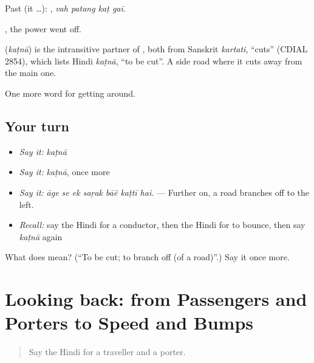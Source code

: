 Past (it …):    , \emph{vah patang kaṭ gaī}.

  , the power went off.

\begin{cousinweb}
\textbf{} (\emph{kaṭnā}) is the intransitive partner of , both from Sanskrit \emph{kartati}, \textquotedblleft{}cuts\textquotedblright{} (CDIAL 2854), which lists Hindi \emph{kaṭnā}, \textquotedblleft{}to be cut\textquotedblright{}. A side road  where it cuts away from the main one.
\end{cousinweb}

\begin{grammarlens}[title={What you've built}]
One more word for getting around.
\end{grammarlens}

\subsection*{Your turn}
\begin{itemize}
\raggedright
  \item \emph{Say it:} \emph{kaṭnā}
  \item \emph{Say it:} \emph{kaṭnā}, once more
  \item \emph{Say it:} \emph{āge se ek saṛak bāẽ kaṭtī hai.} — Further on, a road branches off to the left.
  \item \emph{Recall:} say the Hindi for a conductor, then the Hindi for to bounce, then say \emph{kaṭnā} again
\end{itemize}

\begin{tcolorbox}[breakable,colback=teal!4,colframe=teal!35!black,title={Before you move on}]
What does  mean? (\textquotedblleft{}To be cut; to branch off (of a road)\textquotedblright{}.) Say it once more.
\end{tcolorbox}
\section[(dialogue)]{Looking back: from Passengers and Porters to Speed and Bumps}

\label{lesson:HI-R405-review-398-405}



\begin{quote}
Say the Hindi for a traveller and a porter.
\end{quote}

